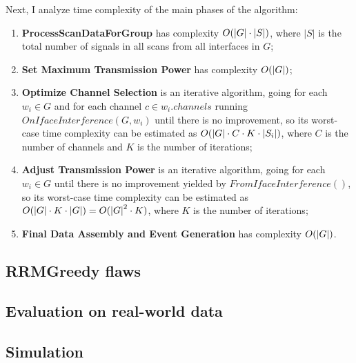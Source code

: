 Next, I analyze time complexity of the main phases of the algorithm:

\begin{enumerate}
    \item \textbf{ProcessScanDataForGroup} has complexity $O(\lvert{G}\rvert \cdot \lvert S \rvert)$, where $\lvert S \rvert$ is the total number of signals in all scans from all interfaces in $G$;
    \item \textbf{Set Maximum Transmission Power} has complexity $O(\lvert{G}\rvert)$;
    \item \textbf{Optimize Channel Selection} is an iterative algorithm, going for each $w_i \in G$ and for each channel $c \in w_i.channels$ running $OnIfaceInterference(G, w_i)$ until there is no improvement, so its worst-case time complexity can be estimated as $O(\lvert{G}\rvert \cdot C \cdot K \cdot \lvert{S_i}\rvert)$, where $C$ is the number of channels and $K$ is the number of iterations;
    \item \textbf{Adjust Transmission Power} is an iterative algorithm, going for each $w_i \in G$ until there is no improvement yielded by $FromIfaceInterference()$, so its worst-case time complexity can be estimated as $O(\lvert{G}\rvert \cdot K \cdot \lvert{G}\rvert) = O({\lvert{G}\rvert}^2 \cdot K)$, where $K$ is the number of iterations;
    \item \textbf{Final Data Assembly and Event Generation} has complexity $O(\lvert{G}\rvert)$.
\end{enumerate}

\subsection{RRMGreedy flaws}
\label{sec:flaws}

\subsection{Evaluation on real-world data}
\label{sec:eval}

\subsection{Simulation}
\label{sec:sim}
